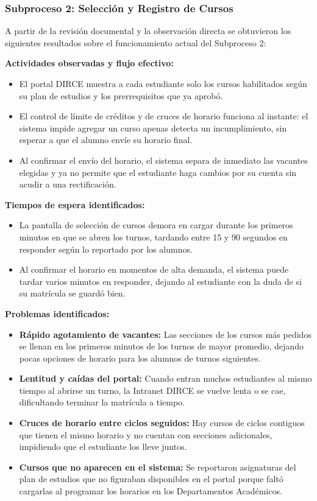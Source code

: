 \subsubsection{Subproceso 2: Selección y Registro de Cursos}

A partir de la revisión documental y la observación directa se obtuvieron los siguientes resultados sobre el funcionamiento actual del Subproceso 2:

\textbf{Actividades observadas y flujo efectivo:}
\begin{itemize}
    \item El portal DIRCE muestra a cada estudiante solo los cursos habilitados según su plan de estudios y los prerrequisitos que ya aprobó.
    \item El control de límite de créditos y de cruces de horario funciona al instante: el sistema impide agregar un curso apenas detecta un incumplimiento, sin esperar a que el alumno envíe su horario final.
    \item Al confirmar el envío del horario, el sistema separa de inmediato las vacantes elegidas y ya no permite que el estudiante haga cambios por su cuenta sin acudir a una rectificación.
\end{itemize}

\textbf{Tiempos de espera identificados:}
\begin{itemize}
    \item La pantalla de selección de cursos demora en cargar durante los primeros minutos en que se abren los turnos, tardando entre 15 y 90 segundos en responder según lo reportado por los alumnos.
    \item Al confirmar el horario en momentos de alta demanda, el sistema puede tardar varios minutos en responder, dejando al estudiante con la duda de si su matrícula se guardó bien.
\end{itemize}

\textbf{Problemas identificados:}
\begin{itemize}
    \item \textbf{Rápido agotamiento de vacantes:} Las secciones de los cursos más pedidos se llenan en los primeros minutos de los turnos de mayor promedio, dejando pocas opciones de horario para los alumnos de turnos siguientes.
    \item \textbf{Lentitud y caídas del portal:} Cuando entran muchos estudiantes al mismo tiempo al abrirse un turno, la Intranet DIRCE se vuelve lenta o se cae, dificultando terminar la matrícula a tiempo.
    \item \textbf{Cruces de horario entre ciclos seguidos:} Hay cursos de ciclos contiguos que tienen el mismo horario y no cuentan con secciones adicionales, impidiendo que el estudiante los lleve juntos.
    \item \textbf{Cursos que no aparecen en el sistema:} Se reportaron asignaturas del plan de estudios que no figuraban disponibles en el portal porque faltó cargarlas al programar los horarios en los Departamentos Académicos.
\end{itemize}
